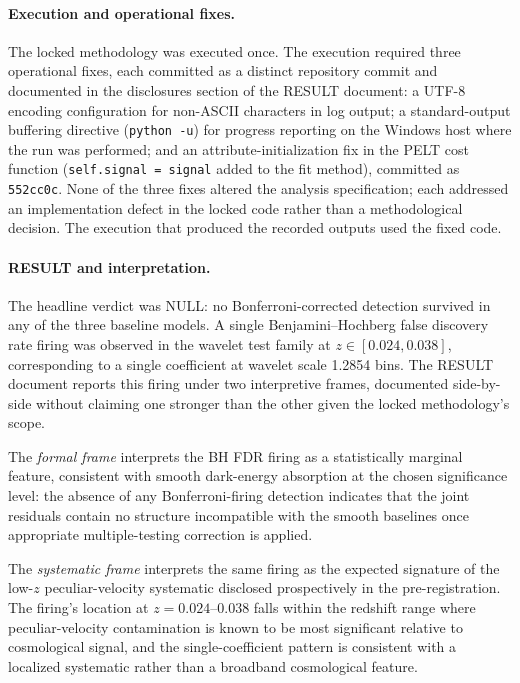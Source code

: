 \documentclass[11pt]{article}
\begin{document}
\paragraph{Execution and operational fixes.}
The locked methodology was executed once. The execution required
three operational fixes, each committed as a distinct repository
commit and documented in the disclosures section of the RESULT
document: a UTF-8 encoding configuration for non-ASCII characters
in log output; a standard-output buffering directive
(\texttt{python -u}) for progress reporting on the Windows host
where the run was performed; and an attribute-initialization fix
in the PELT cost function (\texttt{self.signal = signal} added to
the fit method), committed as \texttt{552cc0c}. None of the three
fixes altered the analysis specification; each addressed an
implementation defect in the locked code rather than a
methodological decision. The execution that produced the recorded
outputs used the fixed code.

\paragraph{RESULT and interpretation.}
The headline verdict was NULL: no Bonferroni-corrected detection
survived in any of the three baseline models. A single
Benjamini--Hochberg false discovery rate firing was observed in the
wavelet test family at $z \in [0.024, 0.038]$, corresponding to a
single coefficient at wavelet scale 1.2854 bins. The RESULT
document reports this firing under two interpretive frames,
documented side-by-side without claiming one stronger than the
other given the locked methodology's scope.

The \emph{formal frame} interprets the BH FDR firing as a
statistically marginal feature, consistent with smooth dark-energy
absorption at the chosen significance level: the absence of any
Bonferroni-firing detection indicates that the joint residuals
contain no structure incompatible with the smooth baselines once
appropriate multiple-testing correction is applied.

The \emph{systematic frame} interprets the same firing as the
expected signature of the low-$z$ peculiar-velocity systematic
disclosed prospectively in the pre-registration. The firing's
location at $z = 0.024$--$0.038$ falls within the redshift range
where peculiar-velocity contamination is known to be most
significant relative to cosmological signal, and the
single-coefficient pattern is consistent with a localized
systematic rather than a broadband cosmological feature.
\end{document}
